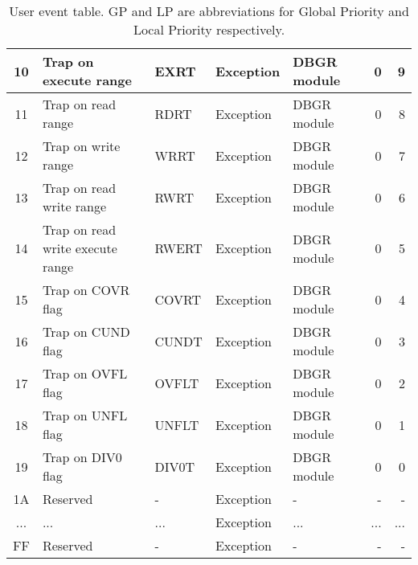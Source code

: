 \begin{table}[hbt!]
\begin{center}
\begin{tabular}{|c|l|l|l|l|r|r|}
        \hline
        10 & Trap on execute range & EXRT & Exception & DBGR module & 0 & 9 \\
        \hline
        11 & Trap on read range & RDRT & Exception & DBGR module & 0 & 8 \\
        \hline
        12 & Trap on write range & WRRT & Exception & DBGR module & 0 & 7 \\
        \hline
        13 & Trap on read write range & RWRT & Exception & DBGR module & 0 & 6 \\
        \hline
        14 & Trap on read write execute range & RWERT & Exception & DBGR module & 0 & 5 \\
        \hline
        15 & Trap on COVR flag & COVRT & Exception & DBGR module & 0 & 4 \\
        \hline
        16 & Trap on CUND flag & CUNDT & Exception & DBGR module & 0 & 3 \\
        \hline
        17 & Trap on OVFL flag & OVFLT & Exception & DBGR module & 0 & 2 \\
        \hline
        18 & Trap on UNFL flag & UNFLT & Exception & DBGR module & 0 & 1 \\
        \hline
        19 & Trap on DIV0 flag & DIV0T & Exception & DBGR module & 0 & 0 \\
        \hline
        1A & Reserved & - & Exception & - & - & - \\
        \hline
        ... & ... & ... & Exception & ... & ... & ... \\
        \hline
        FF & Reserved & - & Exception & - & - & - \\
        \hline

    \end{tabular}

    \caption[User event table]{User event table. GP and LP are abbreviations for Global Priority and Local Priority respectively.}

    \end{center}

\end{table}